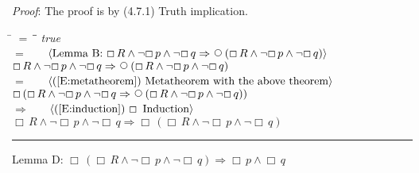 \documentclass[12pt, fleqn, leqno]{article}
\newcommand{\lgap}{2pt}                             %
\newcommand{\mymathindent}{24pt}                    %
\newcommand{\impl}{\ensuremath{\Rightarrow}}        %
\newcommand{\Next}{\;\,\text{\raisebox{3.5pt}{\circle{6}}}}
\newcommand{\Always}{\Box\,}
\newcommand{\myqed}{\rule[-.23ex]{1.2ex}{2.0ex}}
\newcommand{\myqedtab}{\hspace{384pt}}              %
\newcommand{\Gll} {\langle}                         %
\newcommand{\Ggg} {\rangle}                         %
\newcommand{\Hint}[1]     {\ \ \ $\Gll              \mbox{#1} \Ggg$ }   %
\begin{document}
{\emph{Proof}: The proof is by (4.7.1) Truth implication.
\begin{tabbing}
\hspace{\mymathindent} \= $= \;$ \= \myqedtab \= \kill
\> \>   \textit{true}\\[\lgap]
 \> $=$  \>  \Hint{Lemma B: $\Always R \land \neg \Always p \land \neg \Always q \impl \Next (\Always R \land \neg \Always p \land \neg \Always q )$}\\[\lgap]
  \> \>   $\Always R \land \neg \Always p \land \neg \Always q \impl \Next (\Always R \land \neg \Always p \land \neg \Always q )$\\[\lgap]
 \> $=$  \>  \Hint{(\ref{E:metatheorem}) Metatheorem with the above theorem}\\[\lgap]
   \> \>   $\Always (\Always R \land \neg \Always p \land \neg \Always q  \impl \Next (\Always R \land \neg \Always p \land \neg \Always q ))$\\[\lgap]
 \> $\impl$  \>  \Hint{(\ref{E:induction}) $\Always$ Induction}\\[\lgap]
 \> \>   $\Always R \land \neg \Always p \land \neg \Always q  \impl \Always (\Always R \land \neg \Always p \land \neg \Always q )$ \quad \myqed
\end{tabbing}
Lemma D: $\Always (\Always R \land \neg \Always p \land \neg \Always q) \impl \Always p \land \Always q$

}
\end{document}
